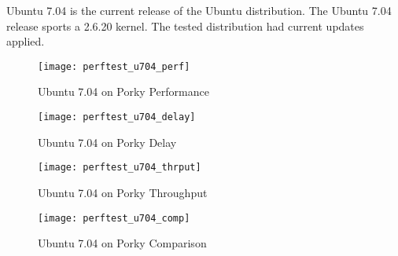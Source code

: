 \documentclass[letterpaper,final,notitlepage,twocolumn,10pt,twoside]{article}
\begin{document}
Ubuntu 7.04 is the current release of the Ubuntu distribution.  The Ubuntu 7.04 release sports a
2.6.20 kernel.  The tested distribution had current updates applied.

\begin{figure}[p]
\texttt{[image: perftest\_u704\_perf]}
\caption[Ubuntu 7.04 on Porky Performance]{Ubuntu 7.04 on Porky Performance}
\label{figure:ubuntuperf}
\end{figure}

\begin{figure}[p]
\texttt{[image: perftest\_u704\_delay]}
\caption[Ubuntu 7.04 on Porky Delay]{Ubuntu 7.04 on Porky Delay}
\label{figure:ubuntudelay}
\end{figure}

\begin{figure}[p]
\texttt{[image: perftest\_u704\_thrput]}
\caption[Ubuntu 7.04 on Porky Throughput]{Ubuntu 7.04 on Porky Throughput}
\label{figure:ubuntuthrput}
\end{figure}

\begin{figure}[pt]
\texttt{[image: perftest\_u704\_comp]}
\caption[Ubuntu 7.04 on Porky Comparison]{Ubuntu 7.04 on Porky Comparison}
\label{figure:ubuntucomp}
\end{figure}
\end{document}
